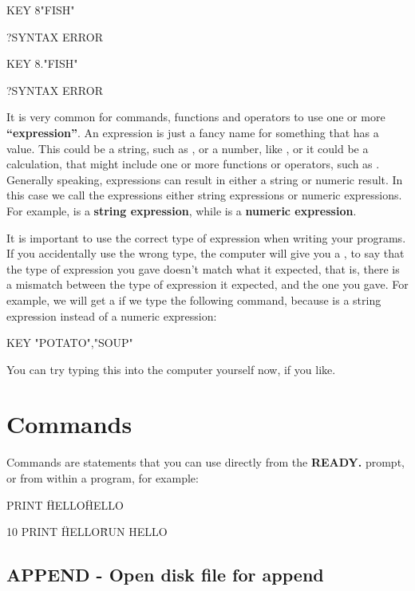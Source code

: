 \begin{screenoutput}
  KEY 8"FISH"

  ?SYNTAX ERROR

  KEY 8."FISH"

  ?SYNTAX ERROR
\end{screenoutput}

It is very common for commands, functions and operators to use one or more {\bf``expression''}.
An expression is just a fancy name for something that has a value.
This could be a string, such as , or a number, like , or it could be a calculation, that might include
one or more functions or operators, such as .
Generally speaking, expressions can result in either a string or numeric result.
In this case we call the expressions either string expressions or numeric expressions.
For example,  is a {\bf string expression}, while  is a {\bf numeric expression}.

It is important to use the correct type of expression when writing your programs.
If you accidentally use the wrong type, the computer will give you a , to say that the type
of expression you gave doesn't match what it expected, that is, there is a mismatch between the type of expression
it expected, and the one you gave.  For example, we will get a  if we type the following command,
because  is a string expression instead of a numeric expression:

\begin{screenoutput}
  KEY "POTATO","SOUP"
\end{screenoutput}

You can try typing this into the computer yourself now, if you like.


\section{Commands}

Commands are statements that you can use directly from the {\bf READY.} prompt, or from within a program, for example:

\begin{screenoutput}
  PRINT \"HELLO\"
  HELLO
  
  10 PRINT \"HELLO\"
  RUN
  HELLO
\end{screenoutput}

\subsection{APPEND - Open disk file for append}

